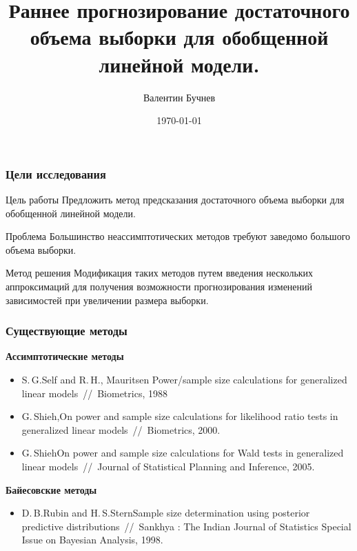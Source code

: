 \documentclass[12pt]{beamer}
\title[Достаточный объем выборки]{Раннее прогнозирование достаточного объема выборки для обобщенной линейной модели.} %
\author{Валентин Бучнев} %
\institute[МФТИ] %
{
МФТИ\\ 
ФИВТ \\ %
\medskip
\textit{buchnev.valentin@gmail.com} %
}
\date{\today} %
\begin{document}
\begin{frame}
\titlepage %
\end{frame}


\begin{frame}
\frametitle{Цели исследования}
\begin{block}{Цель работы}
Предложить метод предсказания достаточного объема выборки для обобщенной линейной модели.
\end{block}
\begin{block}{Проблема}
Большинство неассимптотических методов требуют заведомо большого объема выборки.
\end{block}
\begin{block}{Метод решения}
Модификация таких методов путем введения нескольких аппроксимаций для получения возможности  прогнозирования изменений зависимостей при увеличении размера выборки.
\end{block}

\end{frame}

\begin{frame}
\frametitle{Существующие методы}

\textbf{Ассимптотические методы}

\begin{itemize}
  \item S.\,G.\;Self and R.\,H.,\; Mauritsen Power/sample size calculations for generalized linear
models~//~Biometrics, 1988
  \item G.\,Shieh,\;On power and sample size calculations for likelihood ratio tests in generalized linear models~//~Biometrics, 2000.
  \item G.\,Shieh\;On power and sample size calculations for Wald tests in generalized linear models~//~Journal of Statistical Planning and Inference, 2005.
\end{itemize}

\textbf{Байесовские методы}

\begin{itemize}
  \item D.\,B.\;Rubin and H.\,S.\;Stern\;Sample size determination using posterior predictive distributions~//~Sankhya : The Indian Journal of Statistics Special Issue on Bayesian Analysis, 1998.
\end{itemize}

\end{frame}
\end{document}

